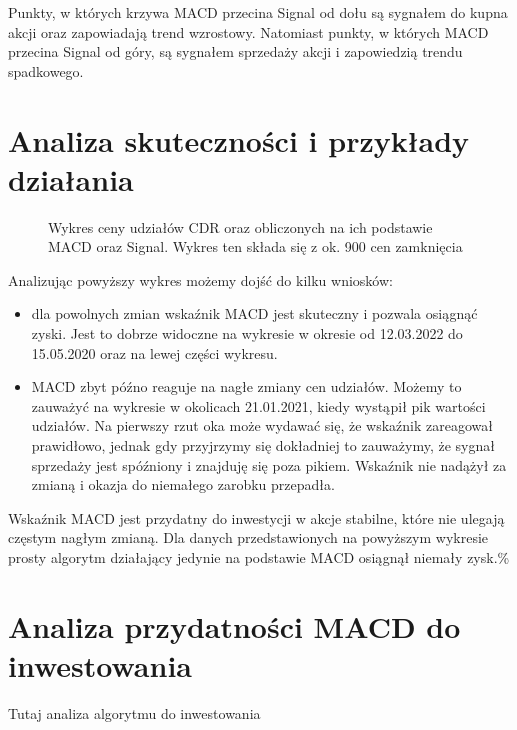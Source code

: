\documentclass{article}
\begin{document}
    Punkty, w których krzywa MACD przecina Signal od dołu są sygnałem do kupna akcji oraz zapowiadają trend wzrostowy.
    Natomiast punkty, w których MACD przecina Signal od góry, są sygnałem sprzedaży akcji i zapowiedzią trendu spadkowego. 

\section{Analiza skuteczności i przykłady działania}
    \begin{figure}[H]
        \noindent{}
        \caption{Wykres ceny udziałów CDR oraz obliczonych na ich podstawie MACD oraz Signal. Wykres ten składa się z ok. 900 cen zamknięcia}
    \end{figure}

    Analizując powyższy wykres możemy dojść do kilku wniosków:
    \begin{itemize}
        \item dla powolnych zmian wskaźnik MACD jest skuteczny i pozwala osiągnąć zyski. Jest to dobrze widoczne na wykresie w okresie od 12.03.2022 do 15.05.2020 oraz na lewej części wykresu.
        \item MACD zbyt późno reaguje na nagłe zmiany cen udziałów. Możemy to zauważyć na wykresie w okolicach 21.01.2021, kiedy wystąpił pik wartości udziałów.
         Na pierwszy rzut oka może wydawać się, że wskaźnik zareagował prawidłowo, jednak gdy przyjrzymy się dokładniej to zauważymy, że sygnał sprzedaży jest spóźniony i znajduję się poza pikiem.
         Wskaźnik nie nadążył za zmianą i okazja do niemałego zarobku przepadła.
    \end{itemize}

    Wskaźnik MACD jest przydatny do inwestycji w akcje stabilne, które nie ulegają częstym nagłym zmianą.
    Dla danych przedstawionych na powyższym wykresie prosty algorytm działający jedynie na podstawie MACD
    osiągnął niemały zysk.\% 
   

    


\section{Analiza przydatności MACD do inwestowania}

    Tutaj analiza algorytmu do inwestowania
\end{document}
